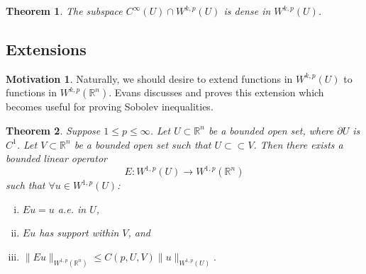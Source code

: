 \documentclass[11pt]{article}
\newtheorem{theorem}{Theorem}
\theoremstyle{definition}
\newtheorem*{motivation}{Motivation}
\begin{document}
\begin{theorem}
	The subspace $C^{\infty}(U) \cap W^{k,p}(U)$ is dense in $W^{k,p}(U)$.
\end{theorem}

\newpage

\subsection{Extensions}
\begin{motivation}
Naturally, we should desire to extend functions in $W^{k,p}(U)$ to functions in $W^{k,p}(\mathbb{R}^n)$.
Evans \cite{evans1998partial} discusses and proves this extension which becomes useful for proving Sobolev inequalities.
\end{motivation}

\begin{theorem}
	Suppose $1 \leq p \leq \infty$.
Let $U \subset \mathbb{R}^n$ be a bounded open set, where $\partial U$ is $C^1$.
Let $V \subset \mathbb{R}^n$ be a bounded open set such that $U \subset\subset V$.
Then there exists a bounded linear operator
	\[E: W^{1,p}(U) \rightarrow W^{1,p}(\mathbb{R}^n)\]
such that $\forall u \in W^{1,p}(U)$:
	\begin{enumerate}[(i)]
		\item $Eu = u$ a.e. in $U$,
		\item $Eu$ has support within $V$, and
		\item $\|Eu\|_{W^{1,p}(\mathbb{R}^n)} \leq C(p,U,V)\|u\|_{W^{1,p}(U)}.$
	\end{enumerate}
\end{theorem}

\newpage
\end{document}
